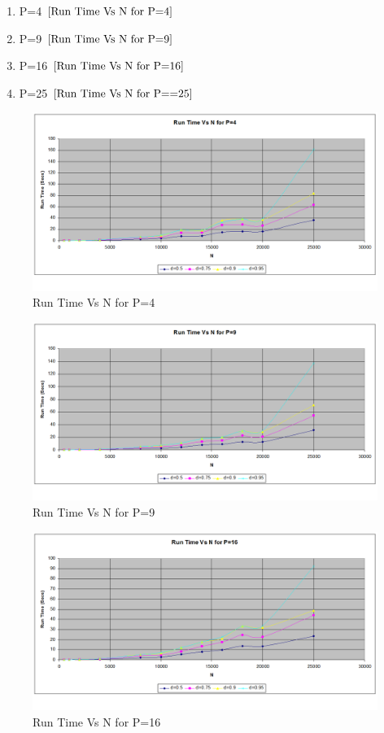\documentclass[twoside,11pt]{article}\usepackage{amsmath,amsfonts,amsthm,fullpage}
\begin{document}
\begin{enumerate}
\item
P=4 $\eqref{Run Time Vs N for P=4}$
\item
P=9 $\eqref{Run Time Vs N for P=9}$
\item
P=16 $\eqref{Run Time Vs N for P=16}$
\item
P=25 $\eqref{Run Time Vs N for P==25}$
\end{enumerate}

\begin{figure}[!htbp]
\centering
\includegraphics[scale=.46]{charts/runtime_n_d_p_4} 
\caption{Run Time Vs N for P=4}
\label{Run Time Vs N for P=4}
\end{figure}

\begin{figure}[!htbp]
\centering
\includegraphics[scale=.46]{charts/runtime_n_d_p_9} 
\caption{Run Time Vs N for P=9}
\label{Run Time Vs N for P=9}
\end{figure}

\begin{figure}[!htbp]
\centering
\includegraphics[scale=.46]{charts/runtime_n_d_p_16} 
\caption{Run Time Vs N for P=16}
\label{Run Time Vs N for P=16}
\end{figure}
\end{document}

